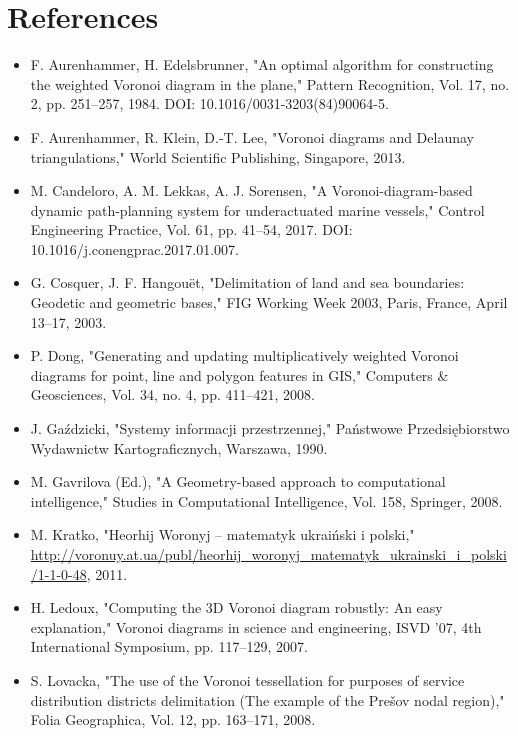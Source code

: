 \documentclass[12pt,a4paper]{report}
\begin{document}
\chapter{References}
\begin{itemize}
  \item F. Aurenhammer, H. Edelsbrunner, "An optimal algorithm for constructing the weighted Voronoi diagram in the plane," Pattern Recognition, Vol. 17, no. 2, pp. 251–257, 1984. DOI: 10.1016/0031-3203(84)90064-5.
  
  \item F. Aurenhammer, R. Klein, D.-T. Lee, "Voronoi diagrams and Delaunay triangulations," World Scientific Publishing, Singapore, 2013.
  
  \item M. Candeloro, A. M. Lekkas, A. J. Sorensen, "A Voronoi-diagram-based dynamic path-planning system for underactuated marine vessels," Control Engineering Practice, Vol. 61, pp. 41–54, 2017. DOI: 10.1016/j.conengprac.2017.01.007.
  
  \item G. Cosquer, J. F. Hangouët, "Delimitation of land and sea boundaries: Geodetic and geometric bases," FIG Working Week 2003, Paris, France, April 13–17, 2003.
  
  \item P. Dong, "Generating and updating multiplicatively weighted Voronoi diagrams for point, line and polygon features in GIS," Computers \& Geosciences, Vol. 34, no. 4, pp. 411–421, 2008.
  
  \item J. Gaździcki, "Systemy informacji przestrzennej," Państwowe Przedsiębiorstwo Wydawnictw Kartograficznych, Warszawa, 1990.
  
  \item M. Gavrilova (Ed.), "A Geometry-based approach to computational intelligence," Studies in Computational Intelligence, Vol. 158, Springer, 2008.
  
  \item M. Kratko, "Heorhij Woronyj – matematyk ukraiński i polski," \url{http://voronuy.at.ua/publ/heorhij_woronyj_matematyk_ukrainski_i_polski/1-1-0-48}, 2011.
  
  \item H. Ledoux, "Computing the 3D Voronoi diagram robustly: An easy explanation," Voronoi diagrams in science and engineering, ISVD ’07, 4th International Symposium, pp. 117–129, 2007.
  
  \item S. Lovacka, "The use of the Voronoi tessellation for purposes of service distribution districts delimitation (The example of the Prešov nodal region)," Folia Geographica, Vol. 12, pp. 163–171, 2008.
  

\end{itemize}
\end{document}
